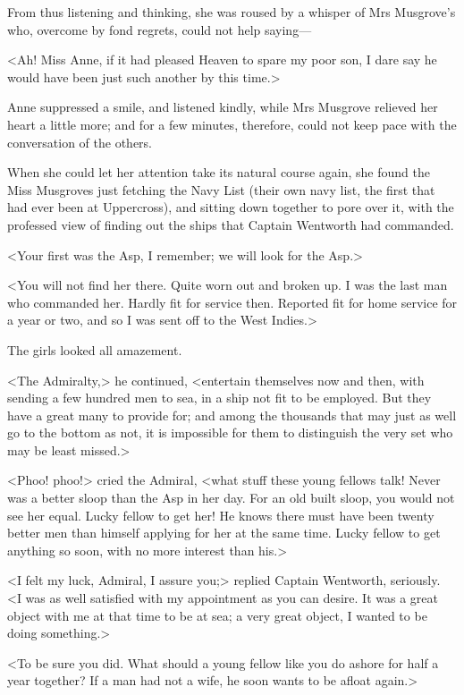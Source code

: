From thus listening and thinking, she was roused by a whisper of Mrs Musgrove's who, overcome by fond regrets, could not help saying—

<Ah! Miss Anne, if it had pleased Heaven to spare my poor son, I dare say he would have been just such another by this time.>

Anne suppressed a smile, and listened kindly, while Mrs Musgrove relieved her heart a little more; and for a few minutes, therefore, could not keep pace with the conversation of the others.

When she could let her attention take its natural course again, she found the Miss Musgroves just fetching the Navy List (their own navy list, the first that had ever been at Uppercross), and sitting down together to pore over it, with the professed view of finding out the ships that Captain Wentworth had commanded.

<Your first was the Asp, I remember; we will look for the Asp.>

<You will not find her there. Quite worn out and broken up. I was the last man who commanded her. Hardly fit for service then. Reported fit for home service for a year or two, and so I was sent off to the West Indies.>

The girls looked all amazement.

<The Admiralty,> he continued, <entertain themselves now and then, with sending a few hundred men to sea, in a ship not fit to be employed. But they have a great many to provide for; and among the thousands that may just as well go to the bottom as not, it is impossible for them to distinguish the very set who may be least missed.>

<Phoo! phoo!> cried the Admiral, <what stuff these young fellows talk! Never was a better sloop than the Asp in her day. For an old built sloop, you would not see her equal. Lucky fellow to get her! He knows there must have been twenty better men than himself applying for her at the same time. Lucky fellow to get anything so soon, with no more interest than his.>

<I felt my luck, Admiral, I assure you;> replied Captain Wentworth, seriously. <I was as well satisfied with my appointment as you can desire. It was a great object with me at that time to be at sea; a very great object, I wanted to be doing something.>

<To be sure you did. What should a young fellow like you do ashore for half a year together? If a man had not a wife, he soon wants to be afloat again.>

